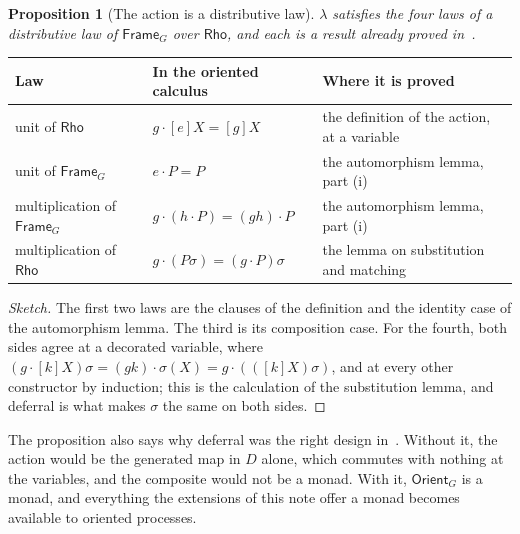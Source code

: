 \documentclass[11pt]{article}
\theoremstyle{branddef}
\theoremstyle{brandplain}
\newtheorem{proposition}[definition]{Proposition}
\theoremstyle{brandrem}
\begin{document}
\begin{proposition}[The action is a distributive law]
\label{prop:beck}
\(\lambda\) satisfies the four laws of a distributive law of
\(\mathsf{Frame}_G\) over \(\mathsf{Rho}\), and each is a result already proved
in~\cite{Oriented}.
\end{proposition}

\begin{center}
\small
\begin{tabular}{@{}L{0.22\textwidth}L{0.30\textwidth}L{0.38\textwidth}@{}}
\toprule
\textbf{Law} & \textbf{In the oriented calculus} & \textbf{Where it is proved} \\
\midrule
unit of \(\mathsf{Rho}\) & \(g\cdot[e]X = [g]X\) &
the definition of the action, at a variable \\[3pt]
unit of \(\mathsf{Frame}_G\) & \(e\cdot P = P\) &
the automorphism lemma, part (i) \\[3pt]
multiplication of \(\mathsf{Frame}_G\) & \(g\cdot(h\cdot P) = (gh)\cdot P\) &
the automorphism lemma, part (i) \\[3pt]
multiplication of \(\mathsf{Rho}\) & \(g\cdot(P\sigma) = (g\cdot P)\sigma\) &
the lemma on substitution and matching \\
\bottomrule
\end{tabular}
\end{center}

\begin{proof}[Sketch]
The first two laws are the clauses of the definition and the identity case of
the automorphism lemma. The third is its composition case. For the fourth,
both sides agree at a decorated variable, where
\((g\cdot[k]X)\sigma = (gk)\cdot\sigma(X) = g\cdot(([k]X)\sigma)\), and at every
other constructor by induction; this is the calculation of the substitution
lemma, and deferral is what makes \(\sigma\) the same on both sides.
\end{proof}

The proposition also says why deferral was the right design in~\cite{Oriented}.
Without it, the action would be the generated map in \(D\) alone, which commutes
with nothing at the variables, and the composite would not be a monad. With it,
\(\mathsf{Orient}_G\) is a monad, and everything the extensions of this note
offer a monad becomes available to oriented processes.
\end{document}
